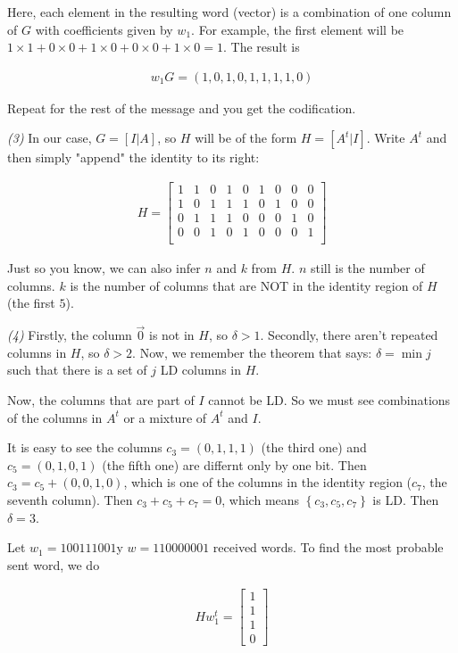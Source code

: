 \documentclass[a4paper]{article}
\begin{document}
Here, each element in the resulting word (vector) is a combination of one column of $G$ with coefficients given by $w_1$. For example, the first element will be $1\times 1 + 0\times 0 + 1 \times 0 + 0\times 0 + 1\times 0 = 1$. The result is

\begin{align*}
    w_1G = (1, 0, 1, 0, 1, 1, 1, 1, 0)
\end{align*}

Repeat for the rest of the message and you get the codification.

\textit{(3)} In our case, $G = [I | A]$, so $H$ will be of the form $H = [A^t | I]$. Write $A^t$ and then simply "append" the identity to its right:

\begin{align*}
    H = \begin{bmatrix} 
        1& 1 &0& 1& 0& 1& 0& 0& 0 \\ 
        1& 0 &1& 1 &1 &0 &1 &0 &0\\ 
        0& 1 &1& 1 &0 &0 &0 &1 &0 \\
        0& 0 &1& 0 &1 &0 &0 &0 &1\\
    \end{bmatrix} 
\end{align*}

Just so you know, we can also infer $n$ and $k$ from $H$. $n$ still is the number of columns. 
$k$ is the number of columns that are NOT in the identity region of $H$ (the first $5$).

\textit{(4)} Firstly, the column $\overrightarrow{0}$ is not in $H$, so $\delta
> 1$. Secondly, there aren't repeated columns in $H$, so $\delta > 2$. Now, we
remember the theorem that says: $\delta = \min j$ such that there is a set 
of $j$ LD columns in $H$.

Now, the columns that are part of $I$ cannot be LD. So we must see combinations
of the columns in $A^t$ or a mixture of $A^t$ and $I$. 

It is easy to see the columns $c_3 = (0, 1, 1, 1)$ (the third one) and $c_5 =
(0, 1, 0, 1)$ (the fifth one) are differnt only by one bit. Then $c_3 = c_5 +
(0, 0, 1, 0)$, which is one of the columns in the identity region ($c_7$, the
seventh column). Then $c_3 + c_5 + c_7 = 0$, which means $\left\{ c_3, c_5, c_7
\right\} $ is LD. Then $\delta = 3$.

Let $w_1 = 100111001 $y $w = 110000001$ received words. To find the most 
probable sent word, we do 

\begin{align*}
    Hw_1^t = \begin{bmatrix} 
           1 \\ 1 \\ 1 \\ 0
    \end{bmatrix} 
\end{align*}
\end{document}
